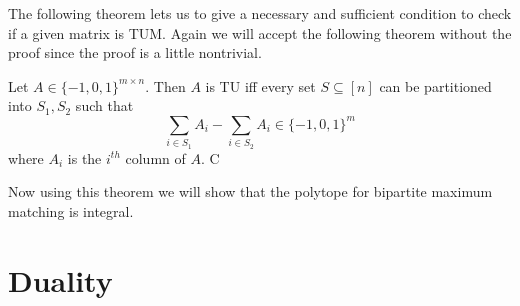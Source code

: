 The following theorem lets us to give a necessary and sufficient condition to check if a given matrix is TUM. Again we will accept the following theorem without the proof since the proof is a little nontrivial.
\begin{Theorem}{}{}
	Let $A\in\{-1,0,1\}^{m\times n}$. Then $A$ is TU iff every set $S\subseteq [n]$ can be partitioned into $S_1, S_2$ such that $$\sum_{i\in S_1}A_i-\sum_{i\in S_2}A_i\in \{-1,0,1\}^m$$where $A_i$ is the $i^{th}$ column of $A$. C
\end{Theorem}

Now using this theorem we will show that the polytope for bipartite maximum matching is integral.
\section{Duality}